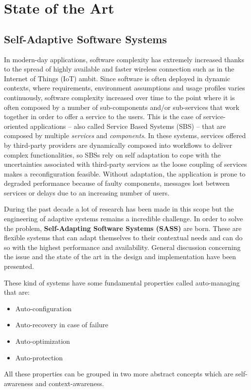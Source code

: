\chapter{State of the Art}
\label{cap:state-of-the-art}

\section{Self-Adaptive Software Systems}
\label{sec:sas}
In modern-day applications, software complexity has extremely increased thanks to the spread of highly available and faster wireless connection such as in the Internet of Things (IoT) ambit. Since software is often deployed in dynamic contexts, where requirements, environment assumptions and usage profiles varies continuously, software complexity increased over time to the point where it is often composed by a number of sub-components and/or sub-services that work together in order to offer a service to the users. This is the case of service-oriented applications -- also called Service Based Systems (SBS) -- that are composed by multiple \emph{services} and \emph{components}. In these systems, services offered by third-party providers are dynamically composed into workflows to deliver complex functionalities, so SBSs rely on self adaptation to cope with the uncertainties associated with third-party services as the loose coupling of services makes a reconfiguration feasible. Without adaptation, the application is prone to degraded performance  because of faulty components, messages lost between services or delays due to an increasing number of users.

During the past decade a lot of research has been made in this scope but the engineering of adaptive systems remains a incredible challenge.\cite{soft-eng-for-sas-2} In order to solve the problem, \textbf{Self-Adapting Software Systems (SASS)} are born. These are flexible systems that can adapt themselves to their contextual needs and can do so with the highest performance and availability. General discussion concerning the issue and the state of the art in the design and implementation have been presented.\cite{soft-eng-for-sas-2}\cite{survey-aut-comp}\cite{self-adap-soft}\cite{soft-eng-for-sas-1}\cite{soft-eng-for-sas-3}\cite{arch-based-appr-to-sas}\cite{sas-quant-ver} 

These kind of systems have some fundamental properties called auto-managing that are:
\begin{itemize}
	\item Auto-configuration
	\item Auto-recovery in case of failure
	\item Auto-optimization
	\item Auto-protection
\end{itemize}
All these properties can be grouped in two more abstract concepts which are self-awareness and context-awareness.

